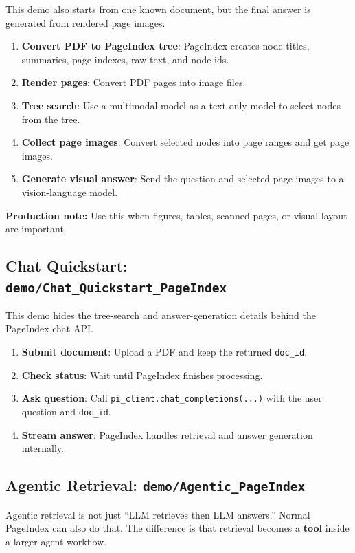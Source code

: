 \documentclass[11pt,a4paper]{article}
\newcommand{\fieldname}[1]{\textcolor{red!70!black}{\texttt{#1}}}
\begin{document}
This demo also starts from one known document, but the final answer is generated from rendered page images.

\begin{enumerate}
    \item \textbf{Convert PDF to PageIndex tree}: PageIndex creates node titles, summaries, page indexes, raw text, and node ids.
    \item \textbf{Render pages}: Convert PDF pages into image files.
    \item \textbf{Tree search}: Use a multimodal model as a text-only model to select nodes from the tree.
    \item \textbf{Collect page images}: Convert selected nodes into page ranges and get page images.
    \item \textbf{Generate visual answer}: Send the question and selected page images to a vision-language model.
\end{enumerate}

\noindent\textbf{Production note:} Use this when figures, tables, scanned pages, or visual layout are important.

\subsection{Chat Quickstart: \texttt{demo/Chat\_Quickstart\_PageIndex}}

This demo hides the tree-search and answer-generation details behind the PageIndex chat API.

\begin{enumerate}
    \item \textbf{Submit document}: Upload a PDF and keep the returned \fieldname{doc\_id}.
    \item \textbf{Check status}: Wait until PageIndex finishes processing.
    \item \textbf{Ask question}: Call \texttt{pi\_client.chat\_completions(...)} with the user question and \fieldname{doc\_id}.
    \item \textbf{Stream answer}: PageIndex handles retrieval and answer generation internally.
\end{enumerate}

\subsection{Agentic Retrieval: \texttt{demo/Agentic\_PageIndex}}

Agentic retrieval is not just ``LLM retrieves then LLM answers.'' Normal PageIndex can also do that. The difference is that retrieval becomes a \textbf{tool} inside a larger agent workflow.
\end{document}
